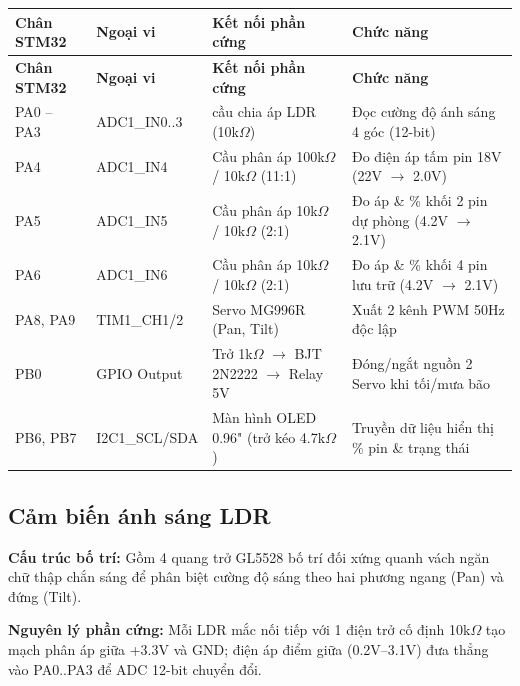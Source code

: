 \documentclass[12pt,a4paper]{report}
\begin{document}
{
\small
\setlength{\LTleft}{0pt}\setlength{\LTright}{0pt}
\begin{longtable}{>{\raggedright\arraybackslash}p{}>{\raggedright\arraybackslash}p{}>{\raggedright\arraybackslash}p{}>{\raggedright\arraybackslash}p{}}
\toprule
\textbf{Chân STM32} & \textbf{Ngoại vi} & \textbf{Kết nối phần cứng} & \textbf{Chức năng} \\
\midrule
\endfirsthead
\toprule
\textbf{Chân STM32} & \textbf{Ngoại vi} & \textbf{Kết nối phần cứng} & \textbf{Chức năng} \\
\midrule
\endhead
\bottomrule
\endfoot
\bottomrule
\endlastfoot
PA0 -- PA3 & ADC1\_IN0..3 & 4 cầu chia áp LDR (10k\ensuremath{\Omega}) & Đọc cường độ ánh sáng 4 góc (12-bit) \\
PA4 & ADC1\_IN4 & Cầu phân áp 100k\ensuremath{\Omega} / 10k\ensuremath{\Omega} (11:1) & Đo điện áp tấm pin 18V (22V \ensuremath{\to} 2.0V) \\
PA5 & ADC1\_IN5 & Cầu phân áp 10k\ensuremath{\Omega} / 10k\ensuremath{\Omega} (2:1) & Đo áp \& \% khối 2 pin dự phòng (4.2V \ensuremath{\to} 2.1V) \\
PA6 & ADC1\_IN6 & Cầu phân áp 10k\ensuremath{\Omega} / 10k\ensuremath{\Omega} (2:1) & Đo áp \& \% khối 4 pin lưu trữ (4.2V \ensuremath{\to} 2.1V) \\
PA8, PA9 & TIM1\_CH1/2 & 2 Servo MG996R (Pan, Tilt) & Xuất 2 kênh PWM 50Hz độc lập \\
PB0 & GPIO Output & Trở 1k\ensuremath{\Omega} \ensuremath{\to} BJT 2N2222 \ensuremath{\to} Relay 5V & Đóng/ngắt nguồn 2 Servo khi tối/mưa bão \\
PB6, PB7 & I2C1\_SCL/SDA & Màn hình OLED 0.96" (trở kéo 4.7k\ensuremath{\Omega}) & Truyền dữ liệu hiển thị \% pin \& trạng thái \\
\end{longtable}
}

\subsection{Cảm biến ánh sáng LDR}

\textbf{Cấu trúc bố trí: }Gồm 4 quang trở GL5528 bố trí đối xứng quanh vách ngăn chữ thập chắn sáng để phân biệt cường độ sáng theo hai phương ngang (Pan) và đứng (Tilt).

\textbf{Nguyên lý phần cứng: }Mỗi LDR mắc nối tiếp với 1 điện trở cố định 10k\ensuremath{\Omega} tạo mạch phân áp giữa +3.3V và GND; điện áp điểm giữa (0.2V--3.1V) đưa thẳng vào PA0..PA3 để ADC 12-bit chuyển đổi.
\end{document}
